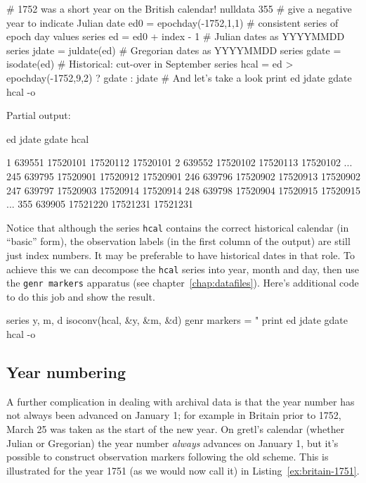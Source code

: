 \begin{script}[htbp]
\begin{scode}
# 1752 was a short year on the British calendar!
nulldata 355
# give a negative year to indicate Julian date
ed0 = epochday(-1752,1,1)
# consistent series of epoch day values
series ed = ed0 + index - 1
# Julian dates as YYYYMMDD
series jdate = juldate(ed)
# Gregorian dates as YYYYMMDD
series gdate = isodate(ed)
# Historical: cut-over in September
series hcal = ed > epochday(-1752,9,2) ? gdate : jdate
# And let's take a look
print ed jdate gdate hcal -o
\end{scode}
  
Partial output:
\begin{outbit}
              ed        jdate        gdate         hcal

  1       639551     17520101     17520112     17520101
  2       639552     17520102     17520113     17520102
...
245       639795     17520901     17520912     17520901
246       639796     17520902     17520913     17520902
247       639797     17520903     17520914     17520914
248       639798     17520904     17520915     17520915
...
355       639905     17521220     17521231     17521231
\end{outbit}
\end{script}

Notice that although the series \texttt{hcal} contains the correct
historical calendar (in ``basic'' form), the observation labels (in
the first column of the output) are still just index numbers. It may
be preferable to have historical dates in that role. To achieve this
we can decompose the \texttt{hcal} series into year, month and day,
then use the \texttt{genr markers} apparatus (see
chapter~\ref{chap:datafiles}). Here's additional code to do this job
and show the result.
\begin{code}
series y, m, d
isoconv(hcal, &y, &m, &d)
genr markers = "%
print ed jdate gdate hcal -o
\end{code}

\subsection{Year numbering}
\label{sec:cal-yearnum}

A further complication in dealing with archival data is that the year
number has not always been advanced on January 1; for example in
Britain prior to 1752, March 25 was taken as the start of the new
year. On gretl's calendar (whether Julian or Gregorian) the year
number \textit{always} advances on January 1, but it's possible to
construct observation markers following the old scheme. This is
illustrated for the year 1751 (as we would now call it) in
Listing~\ref{ex:britain-1751}.

